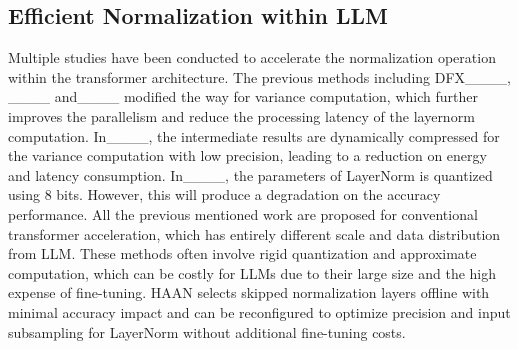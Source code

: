 \subsection{Efficient Normalization within LLM}
\label{sec:bg:related_work}
Multiple studies have been conducted to accelerate the normalization operation within the transformer architecture. The previous methods including DFX____, ____ and____ modified the way for variance computation, which further improves the parallelism and reduce the processing latency of the layernorm computation. 
In____, the intermediate results are dynamically compressed for the variance computation with low precision, leading to a reduction on energy and latency consumption. In____, the parameters of LayerNorm is quantized using 8 bits. However, this will produce a degradation on the accuracy performance.
All the previous mentioned work are proposed for conventional transformer acceleration, which has entirely different scale and data distribution from LLM. These methods often involve rigid quantization and approximate computation, which can be costly for LLMs due to their large size and the high expense of fine-tuning. HAAN selects skipped normalization layers offline with minimal accuracy impact and can be reconfigured to optimize precision and input subsampling for LayerNorm without additional fine-tuning costs.